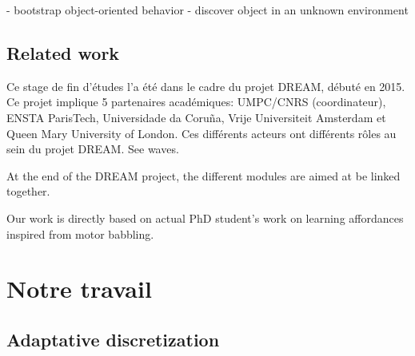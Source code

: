 \documentclass{llncs}
\begin{document}
- bootstrap object-oriented behavior
- discover object in an unknown environment

\subsection{Related work}

Ce stage de fin d'études l'a été dans le cadre du projet DREAM, débuté en 2015. Ce projet implique 5 partenaires académiques: UMPC/CNRS (coordinateur), ENSTA ParisTech, Universidade da Coruña, Vrije Universiteit Amsterdam et Queen Mary University of London. Ces différents acteurs ont différents rôles au sein du projet DREAM. See waves.

At the end of the DREAM project, the different modules are aimed at be linked together.

Our work is directly based on actual PhD student's work on learning affordances inspired from motor babbling.



\section{Notre travail}


\subsection{Adaptative discretization}
\end{document}
